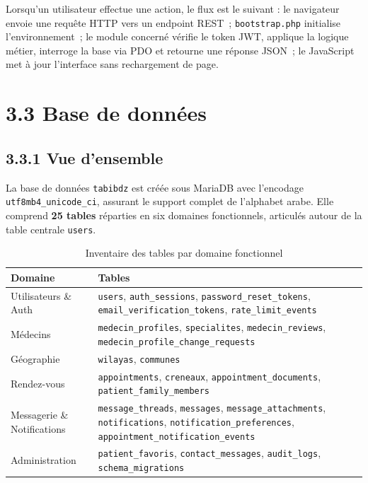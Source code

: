 \documentclass[12pt,a4paper]{report}
\begin{document}
Lorsqu'un utilisateur effectue une action, le flux est le suivant : le navigateur envoie une requ\^ete HTTP vers un endpoint REST~; \texttt{bootstrap.php} initialise l'environnement~; le module concern\'e v\'erifie le token JWT, applique la logique m\'etier, interroge la base via PDO et retourne une r\'eponse JSON~; le JavaScript met \`a jour l'interface sans rechargement de page.

\section*{3.3 Base de donn\'ees}

\subsection*{3.3.1 Vue d'ensemble}

La base de donn\'ees \texttt{tabibdz} est cr\'e\'ee sous MariaDB avec l'encodage \texttt{utf8mb4\_unicode\_ci}, assurant le support complet de l'alphabet arabe. Elle comprend \textbf{25 tables} r\'eparties en six domaines fonctionnels, articul\'es autour de la table centrale \texttt{users}.

\begin{table}[H]
\centering
\renewcommand{\arraystretch}{1.3}
\caption{Inventaire des tables par domaine fonctionnel}
\begin{tabularx}{\textwidth}{|l|X|}
\hline
\textbf{Domaine} & \textbf{Tables} \\
\hline
Utilisateurs \& Auth       & \texttt{users}, \texttt{auth\_sessions}, \texttt{password\_reset\_tokens}, \texttt{email\_verification\_tokens}, \texttt{rate\_limit\_events} \\
\hline
M\'edecins                & \texttt{medecin\_profiles}, \texttt{specialites}, \texttt{medecin\_reviews}, \texttt{medecin\_profile\_change\_requests} \\
\hline
G\'eographie               & \texttt{wilayas}, \texttt{communes} \\
\hline
Rendez-vous               & \texttt{appointments}, \texttt{creneaux}, \texttt{appointment\_documents}, \texttt{patient\_family\_members} \\
\hline
Messagerie \& Notifications & \texttt{message\_threads}, \texttt{messages}, \texttt{message\_attachments}, \texttt{notifications}, \texttt{notification\_preferences}, \texttt{appointment\_notification\_events} \\
\hline
Administration            & \texttt{patient\_favoris}, \texttt{contact\_messages}, \texttt{audit\_logs}, \texttt{schema\_migrations} \\
\hline
\end{tabularx}
\end{table}
\end{document}
